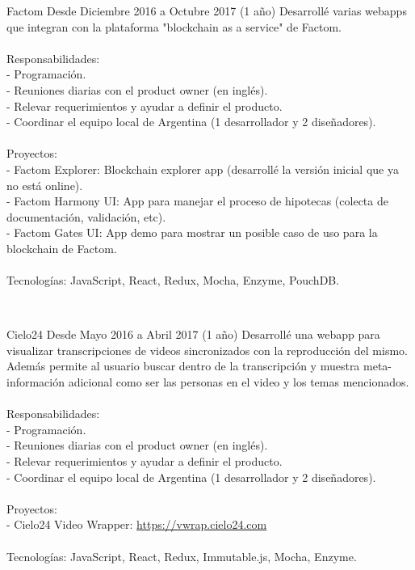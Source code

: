 \begin{enumerate}[leftmargin=0.8cm]
{\begin{itemize}[leftmargin=0.2cm]
      {Factom}
      {Desde Diciembre 2016 a Octubre 2017 (1 año)}
      {
        Desarrollé varias webapps que integran con la plataforma "blockchain as a service" de Factom.
        \\ \\ Responsabilidades:
        \\ - Programación.
        \\ - Reuniones diarias con el product owner (en inglés).
        \\ - Relevar requerimientos y ayudar a definir el producto.
        \\ - Coordinar el equipo local de Argentina (1 desarrollador y 2 diseñadores).
        \\ \\ Proyectos:
        \\ - Factom Explorer: Blockchain explorer app (desarrollé la versión inicial que ya no está online).
        \\ - Factom Harmony UI: App para manejar el proceso de hipotecas (colecta de documentación, validación, etc).
        \\ - Factom Gates UI: App demo para mostrar un posible caso de uso para la blockchain de Factom.
        \\ \\ Tecnologías: JavaScript, React, Redux, Mocha, Enzyme, PouchDB.
      }

      ~

      {Cielo24}
      {Desde Mayo 2016 a Abril 2017 (1 año)}
      {
        Desarrollé una webapp para visualizar transcripciones de videos sincronizados con la reproducción del mismo. Además permite al usuario buscar dentro de la transcripción y muestra meta-información adicional como ser las personas en el video y los temas mencionados.
        \\ \\ Responsabilidades:
        \\ - Programación.
        \\ - Reuniones diarias con el product owner (en inglés).
        \\ - Relevar requerimientos y ayudar a definir el producto.
        \\ - Coordinar el equipo local de Argentina (1 desarrollador y 2 diseñadores).
        \\ \\ Proyectos:
        \\ - Cielo24 Video Wrapper: \url{https://vwrap.cielo24.com}
        \\ \\ Tecnologías: JavaScript, React, Redux, Immutable.js, Mocha, Enzyme.
      }


\end{itemize}}
\end{enumerate}
